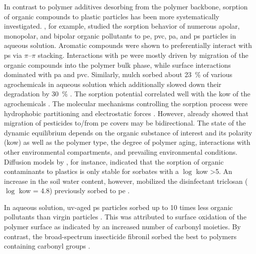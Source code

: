 In contrast to polymer additives desorbing from the polymer backbone, sorption of organic compounds to plastic particles has been more systematically investigated. , for example, studied the sorption behavior of numerous apolar, monopolar, and bipolar organic pollutants to \ac{pe}, \ac{pvc}, \ac{pa}, and \ac{ps} particles in aqueous solution. Aromatic compounds were shown to preferentially interact with \ac{ps} via $\pi$--$\pi$ stacking. Interactions with \ac{pe} were mostly driven by migration of the organic compounds into the polymer bulk phase, while surface interactions dominated with \ac{pa} and \ac{pvc}. Similarly,  mulch sorbed about \SI{23}{\percent} of various agrochemicals in aqueous solution which additionally slowed down their degradation by \SI{30}{\percent} \citep{BeriotLaboratory2020}. The sorption potential correlated well with the \ac{kow} of the agrochemicals \citep{BeriotLaboratory2020,WangAdsorption2020,SuntaAdsorption2020,LanComparative2021}. The molecular mechanisms controlling the sorption process were hydrophobic partitioning and electrostatic forces \citep{TourinhoPartitioning2019,LanComparative2021}.
However, \citet{RamosPolyethylene2015} already showed that migration of pesticides to\slash from \ac{pe} covers may be bidirectional. The state of the dynamic equilibrium depends on the organic substance of interest and its polarity (\ac{kow}) as well as the polymer type, the degree of polymer aging, interactions with other environmental compartments, and prevailing environmental conditions. Diffusion models by \citet{CastanMicroplastics2021}, for instance, indicated that the sorption of organic contaminants to plastics is only stable for sorbates with a $\log$ \ac{kow} >5. An increase in the soil water content, however, mobilized the disinfectant triclosan ($\log$ \ac{kow} = 4.8) previously sorbed to \ac{pe} \citep{ChenComparison2021}.

In aqueous solution, \ac{uv}-aged \ac{ps} particles sorbed up to \num{10} times less organic pollutants than virgin particles \citep{HufferData2018,HufferSorption2018}. This was attributed to surface oxidation of the polymer surface as indicated by an increased number of carbonyl moieties. By contrast, the broad-spectrum insecticide fibronil sorbed the best to polymers containing carbonyl groups \citep{GongComparative2019}.


